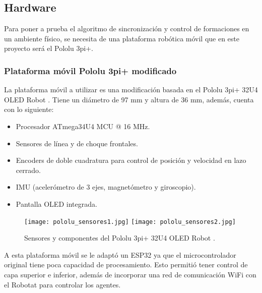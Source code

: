 \subsection*{Hardware}
Para poner a prueba el algoritmo de sincronización y control de formaciones en un ambiente físico, se necesita de una plataforma robótica móvil que en este proyecto será el Pololu 3pi+. 

\subsubsection*{Plataforma móvil Pololu 3pi+ modificado}
La plataforma móvil a utilizar es una modificación basada en el Pololu 3pi+ 32U4 OLED Robot \cite{pololu3pi+}. Tiene un diámetro de 97 mm y altura de 36 mm, además, cuenta con lo siguiente:
\begin{itemize}
	\item Procesador ATmega34U4 MCU @ 16 MHz.
	\item Sensores de línea y de choque frontales.
	\item Encoders de doble cuadratura para control de posición y velocidad en lazo cerrado.
	\item IMU (acelerómetro de 3 ejes, magnetómetro y giroscopio).
	\item Pantalla OLED integrada.
\end{itemize}

\begin{figure}[H]
	\centering
	\texttt{[image: pololu\_sensores1.jpg]} \texttt{[image: pololu\_sensores2.jpg]}
	\caption{Sensores y componentes del Pololu 3pi+ 32U4 OLED Robot \cite{pololu3pi+}.}
	\label{fig:pololu_sensores}
\end{figure}

A esta plataforma móvil se le adaptó un ESP32 ya que el microcontrolador original tiene poca capacidad de procesamiento. Esto permitió tener control de capa superior e inferior, además de incorporar una red de comunicación WiFi con el Robotat para controlar los agentes.








